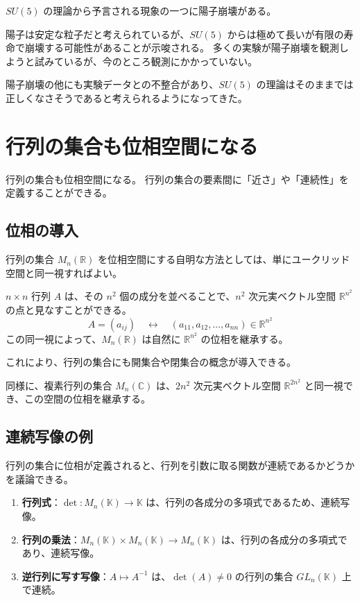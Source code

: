 \documentclass[uplatex,a4j,12pt,dvipdfmx]{jsarticle}
\begin{document}
${}$

$SU(5)$ の理論から予言される現象の一つに陽子崩壊がある。

陽子は安定な粒子だと考えられているが、$SU(5)$ からは極めて長いが有限の寿命で崩壊する可能性があることが示唆される。
多くの実験が陽子崩壊を観測しようと試みているが、今のところ観測にかかっていない。

陽子崩壊の他にも実験データとの不整合があり、$SU(5)$ の理論はそのままでは正しくなさそうであると考えられるようになってきた。





\section{行列の集合も位相空間になる}


行列の集合も位相空間になる。
行列の集合の要素間に「近さ」や「連続性」を定義することができる。

\subsection{位相の導入}

行列の集合 $M_n(\mathbb{R})$ を位相空間にする自明な方法としては、単にユークリッド空間と同一視すればよい。

$n \times n$ 行列 $A$ は、その $n^2$ 個の成分を並べることで、$n^2$ 次元実ベクトル空間 $\mathbb{R}^{n^2}$ の点と見なすことができる。
$$ A = (a_{ij}) \quad \leftrightarrow \quad (a_{11}, a_{12}, \dots, a_{nn}) \in \mathbb{R}^{n^2} $$
この同一視によって、$M_n(\mathbb{R})$ は自然に $\mathbb{R}^{n^2}$ の位相を継承する。

これにより、行列の集合にも開集合や閉集合の概念が導入できる。


同様に、複素行列の集合 $M_n(\mathbb{C})$ は、$2n^2$ 次元実ベクトル空間 $\mathbb{R}^{2n^2}$ と同一視でき、この空間の位相を継承する。

\subsection{連続写像の例}

行列の集合に位相が定義されると、行列を引数に取る関数が連続であるかどうかを議論できる。

\begin{enumerate}
	\item \textbf{行列式}：$\det : M_n(\mathbb{K}) \to \mathbb{K}$ は、行列の各成分の多項式であるため、連続写像。
	\item \textbf{行列の乗法}：$M_n(\mathbb{K}) \times M_n(\mathbb{K}) \to M_n(\mathbb{K})$ は、行列の各成分の多項式であり、連続写像。
	\item \textbf{逆行列に写す写像}：$A \mapsto A^{-1}$ は、$\det(A) \neq 0$ の行列の集合 $GL_n(\mathbb{K})$ 上で連続。
\end{enumerate}
\end{document}
